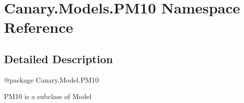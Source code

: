 \hypertarget{namespace_canary_1_1_models_1_1_p_m10}{\section{Canary.\-Models.\-P\-M10 Namespace Reference}
\label{namespace_canary_1_1_models_1_1_p_m10}
}


\subsection{Detailed Description}
\begin{DoxyVerb}@package Canary.Model.PM10

PM10 is a subclass of Model
\end{DoxyVerb}
 